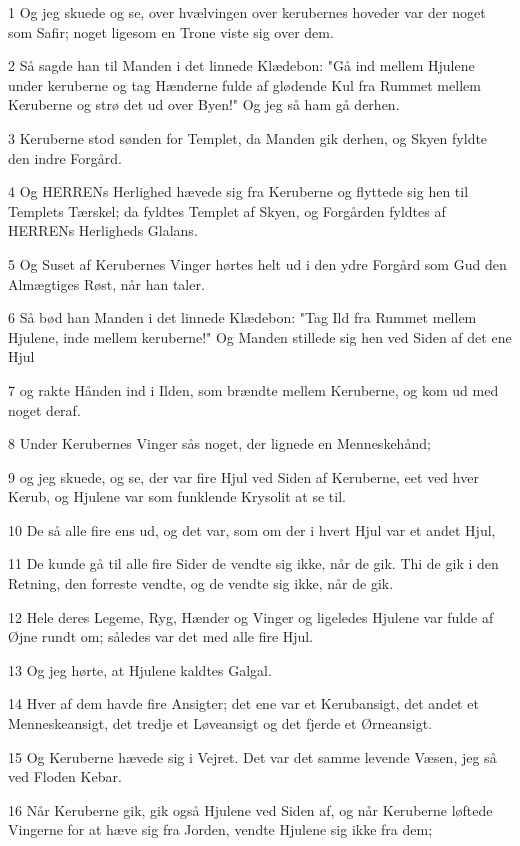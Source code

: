 \par 1 Og jeg skuede og se, over hvælvingen over kerubernes hoveder var der noget som Safir; noget ligesom en Trone viste sig over dem.
\par 2 Så sagde han til Manden i det linnede Klædebon: "Gå ind mellem Hjulene under keruberne og tag Hænderne fulde af glødende Kul fra Rummet mellem Keruberne og strø det ud over Byen!" Og jeg så ham gå derhen.
\par 3 Keruberne stod sønden for Templet, da Manden gik derhen, og Skyen fyldte den indre Forgård.
\par 4 Og HERRENs Herlighed hævede sig fra Keruberne og flyttede sig hen til Templets Tærskel; da fyldtes Templet af Skyen, og Forgården fyldtes af HERRENs Herligheds Glalans.
\par 5 Og Suset af Kerubernes Vinger hørtes helt ud i den ydre Forgård som Gud den Almægtiges Røst, når han taler.
\par 6 Så bød han Manden i det linnede Klædebon: "Tag Ild fra Rummet mellem Hjulene, inde mellem keruberne!" Og Manden stillede sig hen ved Siden af det ene Hjul
\par 7 og rakte Hånden ind i Ilden, som brændte mellem Keruberne, og kom ud med noget deraf.
\par 8 Under Kerubernes Vinger sås noget, der lignede en Menneskehånd;
\par 9 og jeg skuede, og se, der var fire Hjul ved Siden af Keruberne, eet ved hver Kerub, og Hjulene var som funklende Krysolit at se til.
\par 10 De så alle fire ens ud, og det var, som om der i hvert Hjul var et andet Hjul,
\par 11 De kunde gå til alle fire Sider de vendte sig ikke, når de gik. Thi de gik i den Retning, den forreste vendte, og de vendte sig ikke, når de gik.
\par 12 Hele deres Legeme, Ryg, Hænder og Vinger og ligeledes Hjulene var fulde af Øjne rundt om; således var det med alle fire Hjul.
\par 13 Og jeg hørte, at Hjulene kaldtes Galgal.
\par 14 Hver af dem havde fire Ansigter; det ene var et Kerubansigt, det andet et Menneskeansigt, det tredje et Løveansigt og det fjerde et Ørneansigt.
\par 15 Og Keruberne hævede sig i Vejret. Det var det samme levende Væsen, jeg så ved Floden Kebar.
\par 16 Når Keruberne gik, gik også Hjulene ved Siden af, og når Keruberne løftede Vingerne for at hæve sig fra Jorden, vendte Hjulene sig ikke fra dem;
